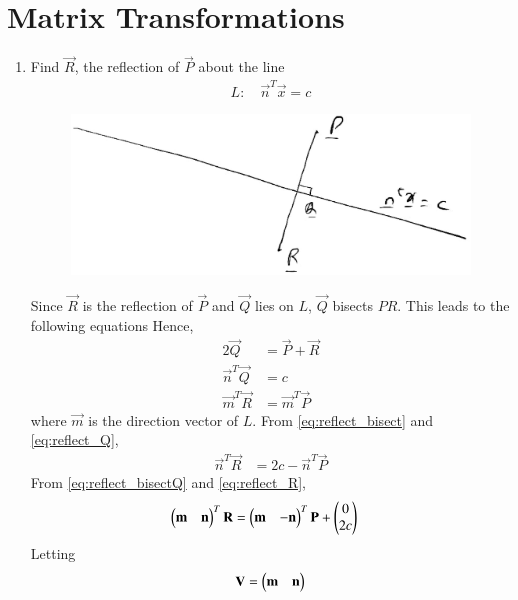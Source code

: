 \documentclass[journal,12pt,twocolumn]{IEEEtran}
\renewcommand\thesection{\arabic{section}}
\begin{document}
\section{Matrix Transformations}
\begin{enumerate}[label=\thesection.\arabic*
,ref=\thesection.\theenumi]

\item Find $\vec{R}$, the reflection  of $\vec{P}$ about the line
\begin{align}
L: \quad \vec{n}^T\vec{x} = c
\end{align}
%
\begin{figure}
\centering
\includegraphics[width=\columnwidth]{./figs/reflection.eps}
\caption{}
\label{fig:locus}
\end{figure}
\solution Since $\vec{R}$ is the reflection of $\vec{P}$ and $\vec{Q}$ lies on $L$, $\vec{Q}$ bisects $PR$.  
This leads to the following equations
Hence, 
\begin{align}
\label{eq:reflect_bisect}
2\vec{Q} &= \vec{P}+\vec{R}
\\
\label{eq:reflect_Q}
\vec{n}^{T}\vec{Q} &= c
\\
\label{eq:reflect_R}
\vec{m}^{T}\vec{R} &= \vec{m}^{T}\vec{P}
\end{align}
%
where $\vec{m}$ is the direction vector of $L$.  From \eqref{eq:reflect_bisect} and \eqref{eq:reflect_Q},
\begin{align}
\label{eq:reflect_bisectQ}
\vec{n}^{T}\vec{R}  &= 2c - \vec{n}^{T}\vec{P}
\end{align}
%
From \eqref{eq:reflect_bisectQ} and \eqref{eq:reflect_R},
\begin{align}
\label{eq:reflect_bisectQR}
\begin{pmatrix}\mathbf{m} & \mathbf{n}\end{pmatrix}^T\mathbf{R} &= \begin{pmatrix}\mathbf{m} & -\mathbf{n}\end{pmatrix}^T\mathbf{P}+ \begin{pmatrix}0 \\ 2c\end{pmatrix}
\end{align}
%
Letting 
\begin{align}
\label{eq:reflect_mat}
\mathbf{V}=  \begin{pmatrix}\mathbf{m} & \mathbf{n}\end{pmatrix}
\end{align}

\end{enumerate}
\end{document}
